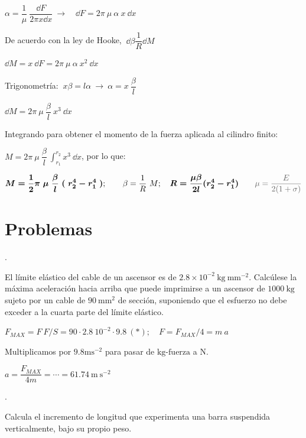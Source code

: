  $\alpha=\dfrac 1 \mu \ \dfrac {\dd F}{2\pi x \dd x} \ \to \quad  \dd F=2 \pi \ \mu \ \alpha \ x \ \dd x$
 
 
De acuerdo con la ley de Hooke, $\ \dd \beta \dfrac 1 R \dd M$

$\dd M = x \ \dd F = 2 \pi \ \mu \ \alpha \ x^2 \ \dd x$

Trigonometría: $\ x\beta = l \alpha \ \to \ \alpha=x\ \dfrac \beta l$

$\dd M = 2\pi \ \mu \ \dfrac \beta l \ x^3 \ \dd x$

Integrando para obtener el momento de la fuerza aplicada al cilindro finito:

$M=\displaystyle  2\pi \ \mu \ \dfrac \beta l \ \int_{r_1}^{r_2} x^3 \ \dd x$, por lo que:

$$\boldsymbol{M= \dfrac 1 2 \pi \ \mu \ \dfrac \beta l \ (\ r_2^4-r_1^4\ )}; \qquad \beta=\dfrac 1 R\ M; \quad \boldsymbol{R=\dfrac{\mu \beta}{2l}(r_2^4-r_1^4)} \textcolor{gris}{\qquad\mu=\dfrac{E}{2(1+\sigma)}}$$


\section{Problemas}

\begin{prob}.

El límite elástico del cable de un ascensor es de $2.8 \times 10^{-2}\ \mathrm{kg} \ \mathrm{mm}^{-2}$. Calcúlese la máxima aceleración hacia arriba que puede imprimirse a un ascensor de $1000\ \mathrm{kg}$ sujeto por un cable de $90\ \mathrm{mm}^2$ de sección, suponiendo que el esfuerzo no debe exceder a la cuarta parte del límite elástico.	
\end{prob}

$F_{MAX}=F\ F/S = 90\cdot 2.8\ 10^{-2} \cdot 9.8 \ (*);\quad F=F_{MAX}/4=m\ a$

\textcolor{gris}{Multiplicamos por $9.8 \mathrm{ms}^{-2}$ para pasar de $\mathrm{kg}$-$\mathrm{fuerza}$ a $\mathrm{N}$.}

$a=\dfrac{F_{MAX}}{4m}=\cdots =61.74\ \mathrm{m\ s}^{-2}$

\begin{prob}.

Calcula el incremento de longitud que experimenta una barra suspendida verticalmente, bajo su propio peso.	
\end{prob}

